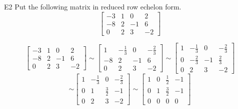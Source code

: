 \begin{problem}{E2}
Put the following matrix in reduced row echelon form.
\[
  \begin{bmatrix}
    -3 & 1 & 0 & 2 \\
    -8 & 2 & -1 & 6 \\
    0 & 2 & 3 & -2
  \end{bmatrix}
\]
\end{problem}
\begin{solution}
\[
  \begin{bmatrix}
  -3 & 1 & 0 & 2 \\
   -8 & 2 & -1 & 6 \\
   0 & 2 & 3 & -2
  \end{bmatrix} \sim
  \begin{bmatrix}
  1 & -\frac{1}{3} & 0 & -\frac{2}{3} \\
   -8 & 2 & -1 & 6 \\
   0 & 2 & 3 & -2
  \end{bmatrix} \sim
  \begin{bmatrix}
  1 & -\frac{1}{3} & 0 & -\frac{2}{3} \\
   0 & -\frac{2}{3} & -1 & \frac{2}{3} \\
   0 & 2 & 3 & -2
  \end{bmatrix}
\]
\[
  \sim
  \begin{bmatrix}
  1 & -\frac{1}{3} & 0 & -\frac{2}{3} \\
   0 & 1 & \frac{3}{2} & -1 \\
   0 & 2 & 3 & -2
  \end{bmatrix} \sim
  \begin{bmatrix}
  1 & 0 & \frac{1}{2} & -1 \\
   0 & 1 & \frac{3}{2} & -1 \\
   0 & 0 & 0 & 0
  \end{bmatrix}
\]
\end{solution}

